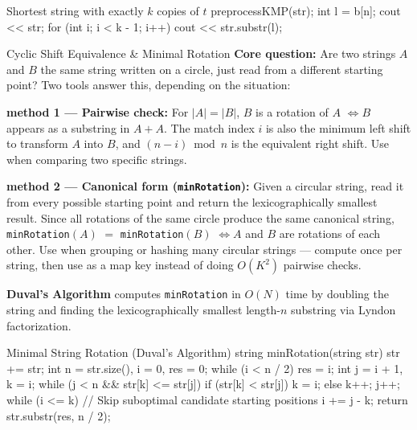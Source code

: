 \documentclass[10pt]{article}
\newcommand{\complexity}[1]{%
  \tcbox[on line,
    colback=tagbg,
    colframe=tagbg,
    boxrule=0pt,
    arc=2pt,
    boxsep=0pt,
    left=3.5pt, right=3.5pt, top=1.5pt, bottom=1.5pt
  ]{\color{tagtext}\scriptsize\bfseries\ensuremath{#1}}%
}
\begin{document}
\begin{vscode}{Shortest string with exactly $k$ copies of $t$}
preprocessKMP(str);
int l = b[n];
cout << str;
for (int i{}; i < k - 1; i++)
    cout << str.substr(l);
\end{vscode}

\newpage
\begin{conceptbox}{Cyclic Shift Equivalence \& Minimal Rotation}
    \textbf{Core question:} Are two strings $A$ and $B$ the same string written on a circle, just read from a different starting point? Two tools answer this, depending on the situation:
    \begin{resultbox}
        \textbf{method 1 --- Pairwise check:} For $|A| = |B|$, $B$ is a rotation of $A$ $\iff B$ appears as a substring in $A + A$. The match index $i$ is also the minimum left shift to transform $A$ into $B$, and $(n - i) \bmod n$ is the equivalent right shift. Use when comparing two specific strings.
    \end{resultbox}
    \begin{resultbox}
        \textbf{method 2 --- Canonical form (\texttt{minRotation}):} Given a circular string, read it from every possible starting point and return the lexicographically smallest result. Since all rotations of the same circle produce the same canonical string, \texttt{minRotation}$(A)$ $=$ \texttt{minRotation}$(B)$ $\iff A$ and $B$ are rotations of each other. Use when grouping or hashing many circular strings --- compute once per string, then use as a map key instead of doing $O(K^2)$ pairwise checks.
    \end{resultbox}
    \textbf{Duval's Algorithm} computes \texttt{minRotation} in $O(N)$ time by doubling the string and finding the lexicographically smallest length-$n$ substring via Lyndon factorization.
\end{conceptbox}

\begin{vscode}{Minimal String Rotation (Duval's Algorithm) \complexity{O(N)}}
string minRotation(string str)
{
    str += str;
    int n = str.size(), i = 0, res = 0;
    while (i < n / 2)
    {
        res = i;
        int j = i + 1, k = i;
        while (j < n && str[k] <= str[j])
        {
            if (str[k] < str[j])
                k = i;
            else
                k++;
            j++;
        }
        while (i <= k) // Skip suboptimal candidate starting positions
            i += j - k;
    }
    return str.substr(res, n / 2);
}
\end{vscode}
\end{document}
